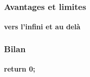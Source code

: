 \documentclass{beamer}
\begin{document}
    \begin{frame}
    \frametitle{Avantages et limites}
    \framesubtitle{vers l'infini et au delà}
    \end{frame}


    \begin{frame}
    \frametitle{Bilan}
    \framesubtitle{return 0;}
    \end{frame}



\end{document}
